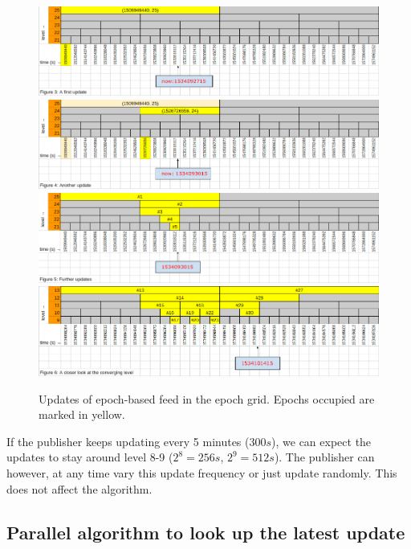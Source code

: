 \begin{figure}[htbp]
\centering
\includegraphics[width=\textwidth]{fig/feeds/00.png}\\
\includegraphics[width=\textwidth]{fig/feeds/01.png}\\
\includegraphics[width=\textwidth]{fig/feeds/02.png}\\
\includegraphics[width=\textwidth]{fig/feeds/03.png}
\caption[Updates of epoch-based feed in the epoch grid]{Updates of epoch-based feed in the epoch grid. Epochs occupied are marked in yellow. }
\label{fig:feeds-update}
\end{figure}

If the publisher keeps updating every 5 minutes ($300s$), we can expect the updates to stay around level 8-9 ($2^8 = 256s$, $2^9 = 512s$). The publisher can however, at any time vary this update frequency or just update randomly. This does not affect the algorithm.

\subsection{Parallel algorithm to look up the latest update \statusorange}\label{sec:feeds-lookup-algo}

